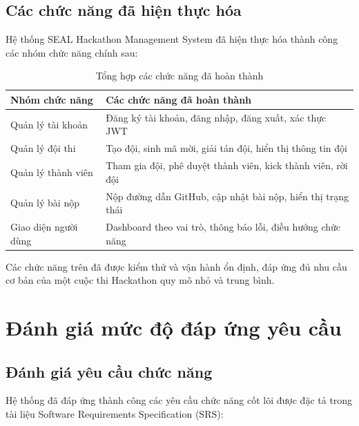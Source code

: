 ﻿\documentclass[12pt,a4paper]{report}
\begin{document}

\subsection{Các chức năng đã hiện thực hóa}

Hệ thống SEAL Hackathon Management System đã hiện thực hóa thành công các nhóm chức năng chính sau:

\begin{table}[H]
	\centering
	\caption{Tổng hợp các chức năng đã hoàn thành}
	\label{tab:completed-features}
	\renewcommand{\arraystretch}{1.3}
	\begin{tabular}{|p{4cm}|p{10cm}|}
		\hline
		\textbf{Nhóm chức năng} & \textbf{Các chức năng đã hoàn thành} \\
		\hline
		Quản lý tài khoản & Đăng ký tài khoản, đăng nhập, đăng xuất, xác thực JWT \\
		\hline
		Quản lý đội thi & Tạo đội, sinh mã mời, giải tán đội, hiển thị thông tin đội \\
		\hline
		Quản lý thành viên & Tham gia đội, phê duyệt thành viên, kick thành viên, rời đội \\
		\hline
		Quản lý bài nộp & Nộp đường dẫn GitHub, cập nhật bài nộp, hiển thị trạng thái \\
		\hline
		Giao diện người dùng & Dashboard theo vai trò, thông báo lỗi, điều hướng chức năng \\
		\hline
	\end{tabular}
\end{table}

Các chức năng trên đã được kiểm thử và vận hành ổn định, đáp ứng đủ nhu cầu cơ bản của một cuộc thi Hackathon quy mô nhỏ và trung bình.


\section{Đánh giá mức độ đáp ứng yêu cầu}

\subsection{Đánh giá yêu cầu chức năng}

Hệ thống đã đáp ứng thành công các yêu cầu chức năng cốt lõi được đặc tả trong tài liệu Software Requirements Specification (SRS):
\end{document}
